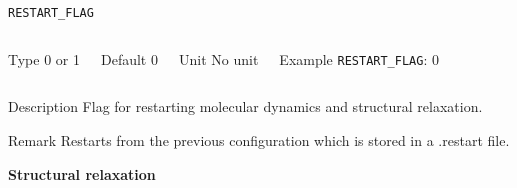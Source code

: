 \documentclass[xcolor=dvipsnames,t]{beamer}
\begin{document}
\begin{frame}[allowframebreaks]{\texttt{RESTART\_FLAG}} \label{RESTART_FLAG}
\vspace*{-12pt}
\begin{columns}
\begin{block}{Type}
0 or 1
\end{block}

\begin{block}{Default}
0
\end{block}

\begin{block}{Unit}
No unit
\end{block}

\begin{block}{Example}
\texttt{RESTART\_FLAG}: 0
\end{block}
\end{columns}

\begin{block}{Description}
Flag for restarting molecular dynamics and structural relaxation.
\end{block}

\begin{block}{Remark}
Restarts from the previous configuration which is stored in a .restart file.
\end{block}

\end{frame}


\begin{frame}[allowframebreaks,c]{} \label{Structural relaxation}

\begin{center}
\Huge \textbf{Structural relaxation}
\end{center}

\end{frame}
\end{document}
